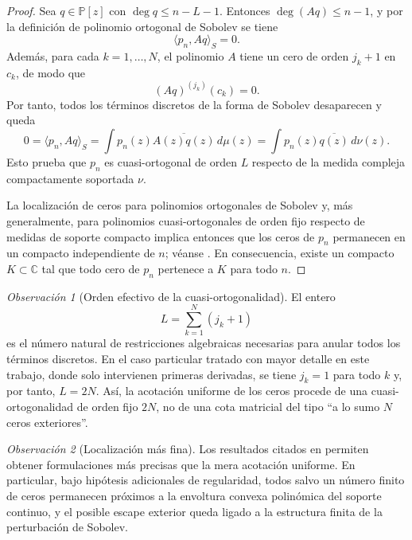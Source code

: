 \documentclass[12pt,a4paper]{article}
\theoremstyle{definition}
\theoremstyle{remark}
\newtheorem{remark}{Observación}
\begin{document}
\begin{proof}
	Sea $q \in \mathbb{P}[z]$ con $\deg q \le n-L-1$. Entonces $\deg(Aq) \le n-1$, y por la definición de polinomio ortogonal de Sobolev se tiene
	\[
		\langle p_n, Aq \rangle_S = 0.
	\]
	Además, para cada $k=1,\dots,N$, el polinomio $A$ tiene un cero de orden $j_k+1$ en $c_k$, de modo que
	\[
		(Aq)^{(j_k)}(c_k)=0.
	\]
	Por tanto, todos los términos discretos de la forma de Sobolev desaparecen y queda
	\[
		0 = \langle p_n, Aq \rangle_S = \int p_n(z)\overline{A(z)q(z)}\,d\mu(z) = \int p_n(z)\overline{q(z)}\,d\nu(z).
	\]
	Esto prueba que $p_n$ es cuasi-ortogonal de orden $L$ respecto de la medida compleja compactamente soportada $\nu$.

	La localización de ceros para polinomios ortogonales de Sobolev y, más generalmente, para polinomios cuasi-ortogonales de orden fijo respecto de medidas de soporte compacto implica entonces que los ceros de $p_n$ permanecen en un compacto independiente de $n$; véanse \cite{lopez1999zero,lopez2001sobolev,marcellan2015sobolev}. En consecuencia, existe un compacto $K \subset \mathbb{C}$ tal que todo cero de $p_n$ pertenece a $K$ para todo $n$.
\end{proof}

\begin{remark}[Orden efectivo de la cuasi-ortogonalidad]
	El entero
	\[
		L = \sum_{k=1}^N (j_k+1)
	\]
	es el número natural de restricciones algebraicas necesarias para anular todos los términos discretos. En el caso particular tratado con mayor detalle en este trabajo, donde solo intervienen primeras derivadas, se tiene $j_k=1$ para todo $k$ y, por tanto, $L=2N$. Así, la acotación uniforme de los ceros procede de una cuasi-ortogonalidad de orden fijo $2N$, no de una cota matricial del tipo ``a lo sumo $N$ ceros exteriores''.
\end{remark}

\begin{remark}[Localización más fina]
	Los resultados citados en \cite{lopez1999zero,lopez2001sobolev,marcellan2015sobolev} permiten obtener formulaciones más precisas que la mera acotación uniforme. En particular, bajo hipótesis adicionales de regularidad, todos salvo un número finito de ceros permanecen próximos a la envoltura convexa polinómica del soporte continuo, y el posible escape exterior queda ligado a la estructura finita de la perturbación de Sobolev.
\end{remark}

\nocite{*}


\end{document}
